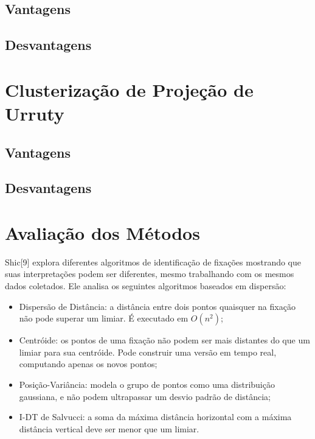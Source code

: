 \documentclass[brazil,]{report}
\begin{document}
\section{Vantagens}\label{vantagens-7}

\section{Desvantagens}\label{desvantagens-7}

\chapter{Clusterização de Projeção de
Urruty}\label{clusterizauxe7uxe3o-de-projeuxe7uxe3o-de-urruty}

\section{Vantagens}\label{vantagens-8}

\section{Desvantagens}\label{desvantagens-8}

\chapter{Avaliação dos Métodos}\label{avaliauxe7uxe3o-dos-muxe9todos}

Shic{[}9{]} explora diferentes algoritmos de identificação de fixações
mostrando que suas interpretações podem ser diferentes, mesmo
trabalhando com os mesmos dados coletados. Ele analisa os seguintes
algoritmos baseados em dispersão:

\begin{itemize}
\itemsep1pt\parskip0pt
\item
  Dispersão de Distância: a distância entre dois pontos quaisquer na
  fixação não pode superar um limiar. É executado em $O(n^2)$;
\item
  Centróide: os pontos de uma fixação não podem ser mais distantes do
  que um limiar para sua centróide. Pode construir uma versão em tempo
  real, computando apenas os novos pontos;
\item
  Posição-Variância: modela o grupo de pontos como uma distribuição
  gaussiana, e não podem ultrapassar um desvio padrão de distância;
\item
  I-DT de Salvucci: a soma da máxima distância horizontal com a máxima
  distância vertical deve ser menor que um limiar.
\end{itemize}
\end{document}
